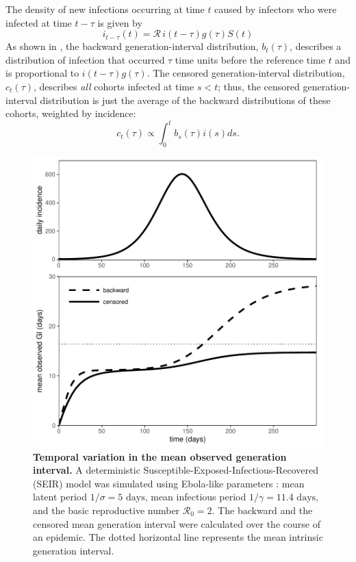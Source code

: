 \documentclass[12pt]{article}
\newcommand{\RR}{\ensuremath{{\mathcal R}}}
\begin{document}
The density of new infections occurring at time $t$ caused by infectors who were infected at time $t-\tau$ is given by
\begin{equation}
i_{t-\tau}(t) = \RR \, i(t-\tau) g(\tau) S(t)
\end{equation}
As shown in \cite{champredon2015intrinsic}, the backward generation-interval distribution, $b_t(\tau)$, describes a distribution of infection that occurred $\tau$ time units before the reference time $t$ and is proportional to $i(t-\tau) g(\tau)$.
The censored generation-interval distribution, $c_t(\tau)$, describes \emph{all} cohorts infected at time $s<t$; thus, the censored generation-interval distribution is just the average of the backward distributions of these cohorts, weighted by incidence:
\begin{equation}
c_t(\tau) \propto \int_0^t b_s(\tau) i(s) ds.
\end{equation}

\begin{figure}[!pbth]
\includegraphics[width=\textwidth]{../fig/temporal_effect.pdf}
\caption{\textbf{Temporal variation in the mean observed generation interval.}
A deterministic Susceptible-Exposed-Infectious-Recovered (SEIR) model was simulated using Ebola-like parameters \citep{who2014ebola}: mean latent period $1/\sigma = 5 \textrm{ days}$, mean infectious period $1/\gamma = 11.4 \textrm{ days}$, and the basic reproductive number $\RR_0 = 2$. 
The backward and the censored mean generation interval were calculated over the course of an epidemic.
The dotted horizontal line represents the mean intrinsic generation interval.
}
\label{fig:censor}
\end{figure}
\end{document}
